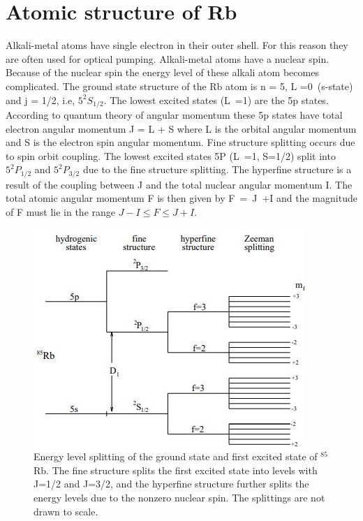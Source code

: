 \section{Atomic structure of Rb }
\label{sec:Rb structure} 
Alkali-metal atoms have single electron in their outer shell. For this reason they are often used for optical pumping. Alkali-metal atoms have a nuclear spin.
 Because of the nuclear spin the energy level of these alkali atom becomes complicated. The ground state structure of the Rb atom is n = 5, L =0~(s-state) and j = 1/2, i.e, $5^2S_{1/2}$. The lowest excited states (L~=1) are the 5p states. According to quantum theory of angular momentum these 5p states have total electron angular momentum J = L + S where L is the orbital angular momentum and S is the electron spin angular momentum. Fine structure splitting occurs due to spin orbit coupling.  The lowest excited states 5P (L~=1, S=1/2) split into  $5^2P_{1/2}$ and $5^2P_{3/2}$  due to the fine structure splitting. The hyperfine structure is a result of the coupling between J and the total nuclear angular momentum I. The total atomic angular momentum F is then given by F~=~J~+I  and the magnitude of F must lie in the range
$J - I \leq F \leq J + I$.
\begin{figure}[h]
\centering
\includegraphics[width=0.7\linewidth]{figures/Rb_structure.JPG}
\caption{ Energy level splitting of the ground state and first excited state of $^{85}$Rb.
The fine structure splits the first excited state into levels with J=1/2 and J=3/2, and the hyperfine
structure further splits the energy levels due to the nonzero nuclear spin.  The splittings are not drawn to scale. \label{fig:Rb_structure}}
\end{figure}

